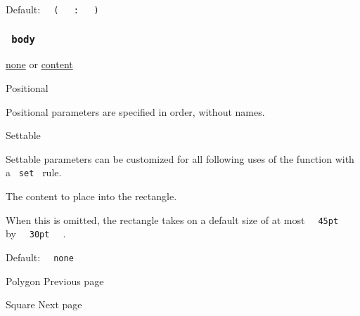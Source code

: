 Default:
\texttt{\ }{\texttt{\ (\ }}\texttt{\ }{\texttt{\ :\ }}\texttt{\ }{\texttt{\ )\ }}\texttt{\ }

\subsubsection{\texorpdfstring{\texttt{\ body\ }}{ body }}\label{parameters-body}

\href{/docs/reference/foundations/none/}{none} {or}
\href{/docs/reference/foundations/content/}{content}

{{ Positional }}

\label{parameters-body-positional-tooltip}
Positional parameters are specified in order, without names.

{{ Settable }}

\label{parameters-body-settable-tooltip}
Settable parameters can be customized for all following uses of the
function with a \texttt{\ set\ } rule.

The content to place into the rectangle.

When this is omitted, the rectangle takes on a default size of at most
\texttt{\ }{\texttt{\ 45pt\ }}\texttt{\ } by
\texttt{\ }{\texttt{\ 30pt\ }}\texttt{\ } .

Default: \texttt{\ }{\texttt{\ none\ }}\texttt{\ }

\href{/docs/reference/visualize/polygon/}{\pandocbounded{}}

{ Polygon } { Previous page }

\href{/docs/reference/visualize/square/}{\pandocbounded{}}

{ Square } { Next page }
